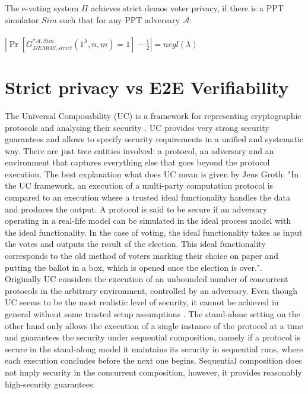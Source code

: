 \begin{definition}
The e-voting system $\Pi$ achieves strict demos voter privacy, if there is a PPT simulator $Sim$ such that for any PPT adversary $\mathcal{A}$:\\\\
 $|\Pr[G_{DEMOS,strict}^{*\mathcal{A},Sim}(1^{\lambda},n,m) = 1] - \frac{1}{2}| = negl(\lambda)$
 \end{definition}
%
\section{Strict privacy vs E2E Verifiability}
The Universal Composability (UC) is a framework for representing cryptographic protocols and analysing their security \cite{Canetti2001}. UC provides very  strong security guarantees and allows to specify security requirements in a unified and systematic way. There are just tree entities involved: a protocol, an adversary and an environment that captures everything else that goes beyond the protocol execution. The best explanation what does UC mean is given by Jens Groth: "In the UC framework, an execution of a multi-party computation protocol is compared to an execution where a trusted ideal functionality handles the data and produces the output. A protocol is said to be secure if an adversary operating in a real-life model can be simulated in the ideal process model with the ideal functionality. In the case of voting, the ideal functionality takes as input the votes and outputs the result of the election. This ideal functionality corresponds to the old method of voters marking their choice on paper and putting the ballot in a box, which is opened once the election is over."\cite{Groth2004}.\\

Originally UC considers the execution of an unbounded number of concurrent protocols in the arbitrary environment, controlled by an adversary. Even though UC seems to be the most realistic level of security, it cannot be achieved in general without some trusted setup assumptions \cite{Lin2009}. The stand-alone setting on the other hand only allows the execution of a single instance of the protocol at a time and guarantees the security under sequential composition, namely if a protocol is secure in the stand-along model it maintains its security in sequential runs, where each execution concludes before the next one begins.  Sequential composition does not imply security in the concurrent composition, however, it provides reasonably high-security guarantees.\\ 

